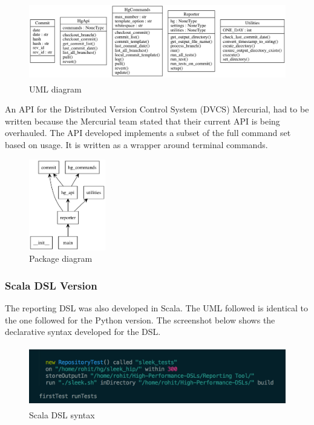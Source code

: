 \begin{figure}[H]
  \centering
    \includegraphics[height=130px]{figures/python_dsl_classes.png}
  \caption{UML diagram}
\end{figure}

\noindent
An API for the Distributed Version Control System (DVCS) Mercurial, had to be written because the Mercurial team stated that their current API is being overhauled. The API developed implements a subset of the full command set based on usage. It is written as a wrapper around terminal commands.

\begin{figure}[H]
  \centering
    \includegraphics[height=150px]{figures/python_dsl_package.png}
  \caption{Package diagram}
\end{figure}

\subsubsection{Scala DSL Version}

The reporting DSL was also developed in Scala. The UML followed is identical to the one followed for the Python version. The screenshot below shows the declarative syntax developed for the DSL.

\begin{figure}[H]
  \centering
    \includegraphics[height=100px]{figures/reportingDSL.png}
  \caption{Scala DSL syntax}
\end{figure}
 

